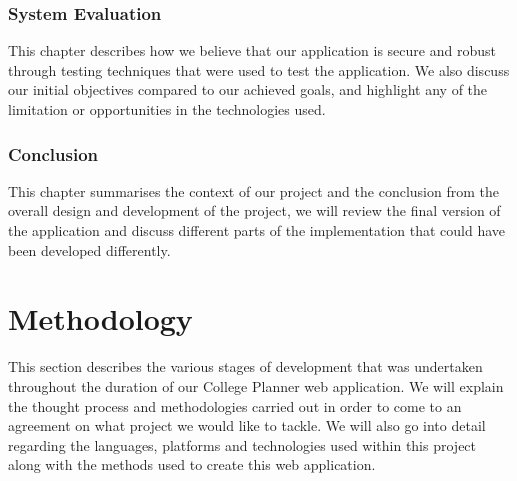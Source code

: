 \subsection{System Evaluation}
This chapter describes how we believe that our application is secure and robust through testing techniques that were used to test the application. We also discuss our initial objectives compared to our achieved goals, and highlight any of the limitation or opportunities in the technologies used.

\subsection{Conclusion}
This chapter summarises the context of our project and the conclusion from the overall design and development of the project, we will review the final version of the application and discuss different parts of the implementation that could have been developed differently.

\chapter{Methodology}
This section describes the various stages of development that was undertaken throughout the duration of our College Planner web application. We will explain the thought process and methodologies carried out in order to come to an agreement on what project we would like to tackle. We will also go into detail regarding the languages, platforms and technologies used within this project along with the methods used to create this web application.


